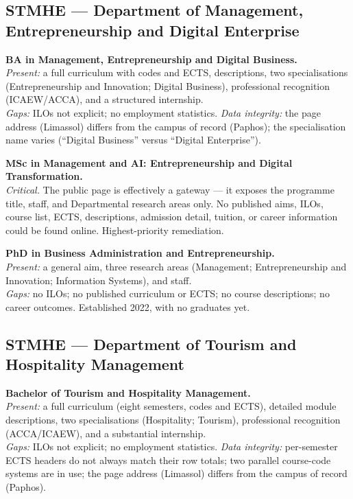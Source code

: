 \documentclass[11pt,a4paper]{article}
\begin{document}
\subsection{STMHE --- Department of Management, Entrepreneurship and Digital Enterprise}

\textbf{BA in Management, Entrepreneurship and Digital Business.}\\
\emph{Present:} a full curriculum with codes and ECTS, descriptions, two specialisations (Entrepreneurship and Innovation; Digital Business), professional recognition (ICAEW/ACCA), and a structured internship.\\
\emph{Gaps:} ILOs not explicit; no employment statistics. \emph{Data integrity:} the page address (Limassol) differs from the campus of record (Paphos); the specialisation name varies (``Digital Business'' versus ``Digital Enterprise'').

\textbf{MSc in Management and AI: Entrepreneurship and Digital Transformation.}\\
\emph{Critical.} The public page is effectively a gateway --- it exposes the programme title, staff, and Departmental research areas only. No published aims, ILOs, course list, ECTS, descriptions, admission detail, tuition, or career information could be found online. Highest-priority remediation.

\textbf{PhD in Business Administration and Entrepreneurship.}\\
\emph{Present:} a general aim, three research areas (Management; Entrepreneurship and Innovation; Information Systems), and staff.\\
\emph{Gaps:} no ILOs; no published curriculum or ECTS; no course descriptions; no career outcomes. Established 2022, with no graduates yet.

\subsection{STMHE --- Department of Tourism and Hospitality Management}

\textbf{Bachelor of Tourism and Hospitality Management.}\\
\emph{Present:} a full curriculum (eight semesters, codes and ECTS), detailed module descriptions, two specialisations (Hospitality; Tourism), professional recognition (ACCA/ICAEW), and a substantial internship.\\
\emph{Gaps:} ILOs not explicit; no employment statistics. \emph{Data integrity:} per-semester ECTS headers do not always match their row totals; two parallel course-code systems are in use; the page address (Limassol) differs from the campus of record (Paphos).
\end{document}
